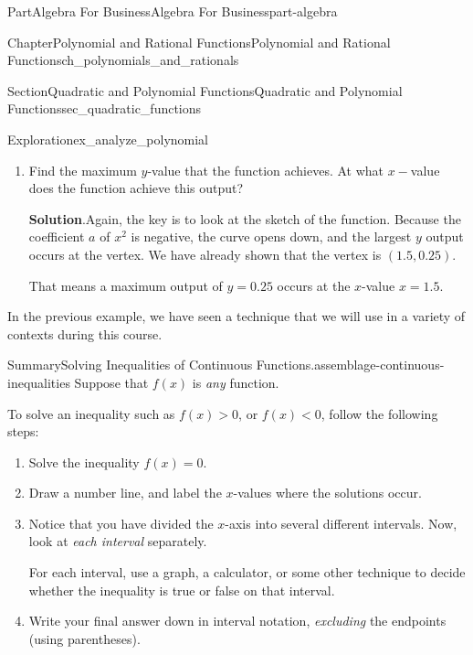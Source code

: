 \documentclass[oneside,10pt,]{tufte-book}
\newcommand{\blocktitlefont}{\relax}
\numberwithin{equation}{chapter}
\newcommand{\lt}{<}
\newcommand{\gt}{>}
\begin{document}
\begin{partptx}{Part}{Algebra For Business}{}{Algebra For Business}{}{}{part-algebra}
\begin{chapterptx}{Chapter}{Polynomial and Rational Functions}{}{Polynomial and Rational Functions}{}{}{ch_polynomials_and_rationals}
\begin{sectionptx}{Section}{Quadratic and Polynomial Functions}{}{Quadratic and Polynomial Functions}{}{}{sec_quadratic_functions}
\begin{exploration}{Exploration}{}{ex_analyze_polynomial}
\begin{enumerate}[font=\bfseries,label=(\alph*),ref=\alph*]
\begin{image}{0.125}{0.75}{0.125}{}
{
}%
\end{image}%
We can see that the function outputs values \emph{strictly} greater than \(0\) if and only if \(1\lt x\lt 2\), which corresponds to the interval \((1,2)\)%
\item{}Find the maximum \(y\)-value that the function achieves.  At what \(x-\)value does the function achieve this output?%
\par\smallskip%
\noindent\textbf{\blocktitlefont Solution}.\hypertarget{ex_analyze_polynomial-6-2}{}\quad{}Again, the key is to look at the sketch of the function.  Because the coefficient \(a\) of \(x^2\) is negative, the curve opens down, and the largest \(y\) output occurs at the vertex.  We have already shown that the vertex is \((1.5,0.25)\).%
\par
That means a maximum output of \(y=0.25\) occurs at the \(x\)-value \(x=1.5\).%
\end{enumerate}%
\end{exploration}%
In the previous example, we have seen a technique that we will use in a variety of contexts during this course.%
\begin{assemblage}{Summary}{Solving Inequalities of Continuous Functions.}{assemblage-continuous-inequalities}%
Suppose that \(f(x)\) is \emph{any} function.%
\par
To solve an inequality such as  \(f(x) \gt 0\), or \(f(x) \lt 0\), follow the following steps:%
\par
%
\begin{enumerate}
\item{}Solve the inequality \(f(x) = 0\).%
\item{}Draw a number line, and label the \(x\)-values where the solutions occur.%
\item{}Notice that you have divided the \(x\)-axis into several different intervals. Now, look at \emph{each interval} separately.%
\par
For each interval, use a graph, a calculator, or some other technique to decide whether the inequality is true or false on that interval.%
\item{}Write your final answer down in interval notation, \emph{excluding} the endpoints (using parentheses).%

\end{enumerate}
\end{assemblage}
\end{sectionptx}
\end{chapterptx}
\end{partptx}
\end{document}
